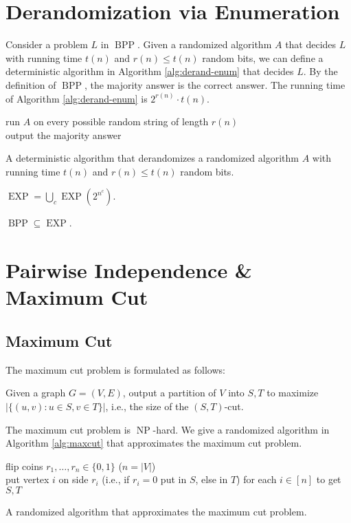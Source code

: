 \documentclass[letterpaper, reqno,11pt]{article}
\DeclareMathOperator{\BPP}{BPP}
\DeclareMathOperator{\EXP}{EXP}
\DeclareMathOperator{\NP}{NP}
\begin{document}
\section{Derandomization via Enumeration}

Consider a problem $L$ in $\BPP$. Given a randomized algorithm $A$ that decides $L$ with running time $t(n)$ and $r(n) \leq t(n)$ random bits, we can define a deterministic algorithm in Algorithm \ref{alg:derand-enum} that decides $L$. By the definition of $\BPP$, the majority answer is the correct answer. The running time of Algorithm \ref{alg:derand-enum} is $2^{r(n)} \cdot t(n)$.

\begin{algorithm}
  run $A$ on every possible random string of length $r(n)$ \\
  output the majority answer
  \caption{A deterministic algorithm that derandomizes a randomized algorithm $A$ with running time $t(n)$ and $r(n) \leq t(n)$ random bits.}
  \label{alg:derand-enum}
\end{algorithm}

\begin{definition}
  $\EXP = \bigcup_c \EXP(2^{n^c})$.
\end{definition}

\begin{corollary}
  $\BPP \subseteq \EXP$.
\end{corollary}

\section{Pairwise Independence \& Maximum Cut}

\subsection{Maximum Cut}

The maximum cut problem is formulated as follows:
\begin{problem}
  Given a graph $G = (V, E)$, output a partition of $V$ into $S, T$ to maximize $|\{ (u, v) : u \in S, v \in T \}|$, i.e., the size of the $(S, T)$-cut.
\end{problem}

The maximum cut problem is $\NP$-hard. We give a randomized algorithm in Algorithm \ref{alg:maxcut} that approximates the maximum cut problem.

\begin{algorithm}
  flip coins $r_1, \ldots, r_n \in \{ 0, 1 \}$ ($n = |V|$) \\
  put vertex $i$ on side $r_i$ (i.e., if $r_i = 0$ put in $S$, else in $T$) for each $i \in [n]$ to get $S, T$
  \caption{A randomized algorithm that approximates the maximum cut problem.}
  \label{alg:maxcut}
\end{algorithm}
\end{document}
